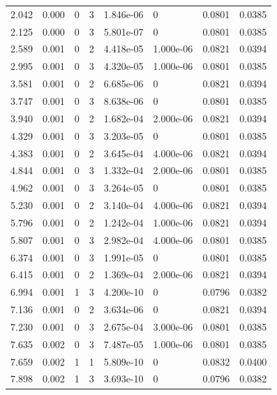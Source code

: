 \documentclass[preview]{standalone}
\begin{document}
{{\begin{tabular}{L{1.2cm}C{1.2cm} C{0.3cm}C{0.5cm} C{1.4cm}C{1.4cm} C{1.4cm}C{1.4cm}}
  2.042  &  0.000  & 0     &  3 &  1.846e-06  & 0  & 0.0801 &  0.0385   \\ 
  2.125  &  0.000  & 0     &  3 &  5.801e-07  & 0  & 0.0801 &  0.0385   \\ 
  2.589  &  0.001  & 0     &  2 &  4.418e-05  & 1.000e-06  & 0.0821 &  0.0394   \\ 
  2.995  &  0.001  & 0     &  3 &  4.320e-05  & 1.000e-06  & 0.0801 &  0.0385   \\ 
  3.581  &  0.001  & 0     &  2 &  6.685e-06  & 0  & 0.0821 &  0.0394   \\ 
  3.747  &  0.001  & 0     &  3 &  8.638e-06  & 0  & 0.0801 &  0.0385   \\ 
  3.940  &  0.001  & 0     &  2 &  1.682e-04  & 2.000e-06  & 0.0821 &  0.0394   \\ 
  4.329  &  0.001  & 0     &  3 &  3.203e-05  & 0  & 0.0801 &  0.0385   \\ 
  4.383  &  0.001  & 0     &  2 &  3.645e-04  & 4.000e-06  & 0.0821 &  0.0394   \\ 
  4.844  &  0.001  & 0     &  3 &  1.332e-04  & 2.000e-06  & 0.0801 &  0.0385   \\ 
  4.962  &  0.001  & 0     &  3 &  3.264e-05  & 0  & 0.0801 &  0.0385   \\ 
  5.230  &  0.001  & 0     &  2 &  3.140e-04  & 4.000e-06  & 0.0821 &  0.0394   \\ 
  5.796  &  0.001  & 0     &  2 &  1.242e-04  & 1.000e-06  & 0.0821 &  0.0394   \\ 
  5.807  &  0.001  & 0     &  3 &  2.982e-04  & 4.000e-06  & 0.0801 &  0.0385   \\ 
  6.374  &  0.001  & 0     &  3 &  1.991e-05  & 0  & 0.0801 &  0.0385   \\ 
  6.415  &  0.001  & 0     &  2 &  1.369e-04  & 2.000e-06  & 0.0821 &  0.0394   \\ 
  6.994  &  0.001  & 1     &  3 &  4.200e-10  & 0  & 0.0796 &  0.0382   \\ 
  7.136  &  0.001  & 0     &  2 &  3.634e-06  & 0  & 0.0821 &  0.0394   \\ 
  7.230  &  0.001  & 0     &  3 &  2.675e-04  & 3.000e-06  & 0.0801 &  0.0385   \\ 
  7.635  &  0.002  & 0     &  3 &  7.487e-05  & 1.000e-06  & 0.0801 &  0.0385   \\ 
  7.659  &  0.002  & 1     &  1 &  5.809e-10  & 0  & 0.0832 &  0.0400   \\ 
  7.898  &  0.002  & 1     &  3 &  3.693e-10  & 0  & 0.0796 &  0.0382   \\ 

\end{tabular}}}
\end{document}
